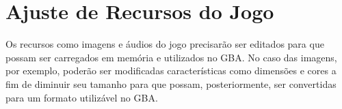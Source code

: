 \section{Ajuste de Recursos do Jogo}

Os recursos como imagens e áudios do jogo precisarão ser editados para que possam ser carregados em memória e utilizados no GBA. No caso das imagens, por exemplo, poderão ser modificadas características como dimensões e cores a fim de diminuir seu tamanho para que possam, posteriormente, ser convertidas para um formato utilizável no GBA.
